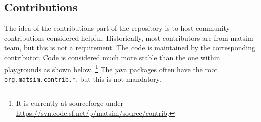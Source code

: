 \subsection{Contributions}




The idea of the \glspl{contribution} part of the repository is to host community contributions considered helpful. 
Historically, most contributors are from \gls{matsim} team, but this is not a requirement.
The code is maintained by the corresponding contributor. 
Code is considered much more stable than the one within playgrounds as shown below.%
\footnote{
It is currently at \gls{sourceforge} under \url{https://svn.code.sf.net/p/matsim/source/contrib}.  
}
The \gls{java} packages often have the root \lstinline{org.matsim.contrib.*}, but this is not mandatory.

